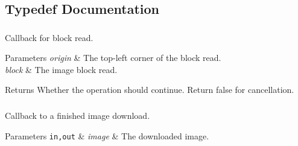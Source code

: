 \subsection{Typedef Documentation}
\subsubsection[{\texorpdfstring{Block\+Read\+Func}{BlockReadFunc}}]{}\hypertarget{group___imagery_module_ga2238c2ef34502f68956ddef1f477ad95}{}\label{group___imagery_module_ga2238c2ef34502f68956ddef1f477ad95}


Callback for block read. 


\begin{DoxyParams}{Parameters}
{\em origin} & The top-\/left corner of the block read. \\
\hline
{\em block} & The image block read. \\
\hline
\end{DoxyParams}
\begin{DoxyReturn}{Returns}
Whether the operation should continue. Return false for cancellation. 
\end{DoxyReturn}
\subsubsection[{\texorpdfstring{Image\+Download\+Callback}{ImageDownloadCallback}}]{}\hypertarget{group___imagery_module_gab8f15d39d6d4bd5bcd727b5d8b28a721}{}\label{group___imagery_module_gab8f15d39d6d4bd5bcd727b5d8b28a721}


Callback to a finished image download. 


\begin{DoxyParams}[1]{Parameters}
\mbox{\tt in,out}  & {\em image} & The downloaded image. \\
\hline
\end{DoxyParams}
\subsubsection[{\texorpdfstring{Image\+Download\+Requests}{ImageDownloadRequests}}]{}\hypertarget{group___imagery_module_ga759e24100f96d6dee1eee94f4f1d6898}{}\label{group___imagery_module_ga759e24100f96d6dee1eee94f4f1d6898}


